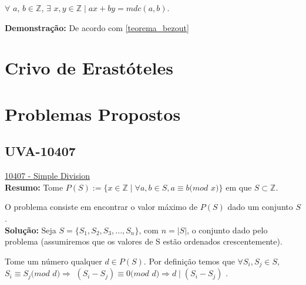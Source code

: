 \begin{theorem}\label{teorema_bezout}
$\forall$ $a$, $b \in \mathbb{Z}$, $\exists$ $x, y \in \mathbb{Z} \mid ax + by = mdc(a, b).$
\end{theorem}
\textbf{Demonstração:}
De acordo com \autoref{teorema_bezout}




\section{Crivo de Erastóteles}






\section{Problemas Propostos}


\subsection{UVA-10407}
\href{https://uva.onlinejudge.org/index.php?option=onlinejudge&page=show_problem&problem=1348}{10407 - Simple Division} \\

\textbf{Resumo:} 
Tome $P(S) := \{ x \in \mathbb{Z} \mid  \forall a , b \in S , a \equiv b ( mod$ $x)\}$ em que $S \subset \mathbb{Z}$.

O problema consiste em encontrar o valor máximo de $P(S)$ dado um conjunto $S$.
\\

\textbf{Solução:} 
Seja $S = \{S_1, S_2, S_3, ..., S_n\}$, com $n = |S|$, o conjunto dado pelo problema (assumiremos que os valores de S estão ordenados crescentemente).

Tome um número qualquer $d \in P(S)$. Por definição temos que $\forall S_i, S_j \in S$, $S_i \equiv S_j ( mod$ $d) \Rightarrow $ 
$ (S_i-S_j) \equiv 0 ( mod$ $d) \Rightarrow d \mid (S_i-S_j)$ .


